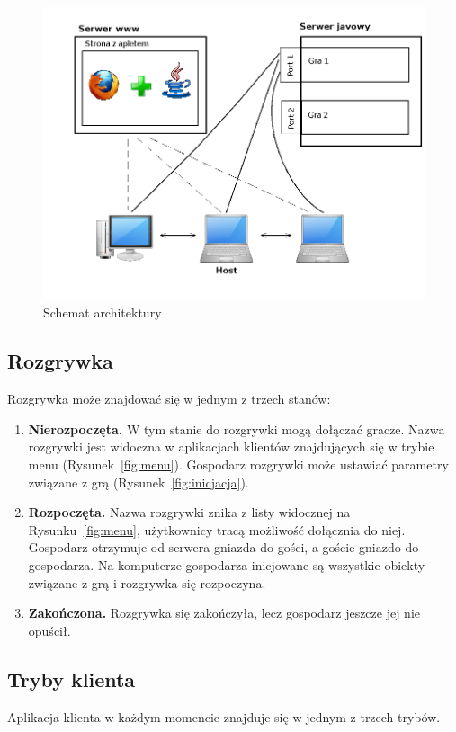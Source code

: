 \documentclass[a4paper, 12pt]{article}
\begin{document}
\begin{figure}
\centering
\includegraphics[scale=0.6]{rysunki/arch.png}
\caption{Schemat architektury}
\label{fig:arch}
\end{figure}

\subsection{Rozgrywka}
Rozgrywka może znajdować się w jednym z trzech stanów:
\begin{enumerate}
 \item \textbf{Nierozpoczęta.} W tym stanie do rozgrywki mogą dołączać gracze. Nazwa rozgrywki jest widoczna w aplikacjach klientów znajdujących się w trybie menu (Rysunek~\ref{fig:menu}). Gospodarz rozgrywki może ustawiać parametry związane z grą (Rysunek~\ref{fig:inicjacja}). 

 \item \textbf{Rozpoczęta.} Nazwa rozgrywki znika z listy widocznej na Rysunku~\ref{fig:menu}, użytkownicy tracą możliwość dołącznia do niej. Gospodarz otrzymuje od serwera gniazda do gości, a goście gniazdo do gospodarza. Na komputerze gospodarza inicjowane są wszystkie obiekty związane z grą i rozgrywka się rozpoczyna.

 \item \textbf{Zakończona.} Rozgrywka się zakończyła, lecz gospodarz jeszcze jej nie opuścił.
\end{enumerate}

\subsection{Tryby klienta}
Aplikacja klienta w każdym momencie znajduje się w jednym z trzech trybów.
\end{document}
